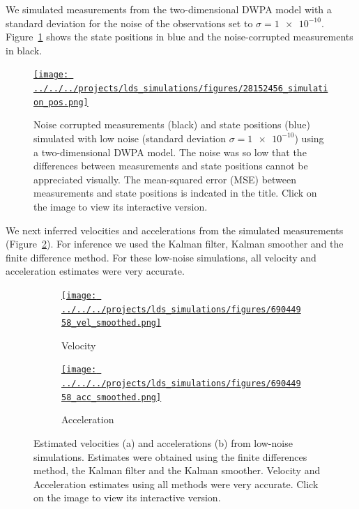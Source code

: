 \documentclass[12pt]{article}
\begin{document}
We simulated measurements from the two-dimensional DWPA model with a standard
deviation for the noise of the observations set to $\sigma=\num{1e-10}$.
Figure~\ref{fig:simulations_low_noise} shows the state positions in blue and
the noise-corrupted measurements in black.

\begin{figure}

    \centering
    \href{http://www.gatsby.ucl.ac.uk/~rapela/fwg/lds_repo/inference/figures/28152456_simulation_pos.html}{\texttt{[image: ../../../projects/lds\_simulations/figures/28152456\_simulation\_pos.png]}}

    \caption{Noise corrupted measurements (black) and state positions
    (blue) simulated with low noise (standard deviation $\sigma=\num{1e-10}$)
    using a two-dimensional DWPA model. The noise was so low that the
    differences between measurements and state positions cannot be appreciated
    visually.  The mean-squared error (MSE) between measurements and state
    positions is indcated in the title.
    Click on the image to view its interactive version.}

        \label{fig:simulations_low_noise}

\end{figure}

We next inferred velocities and accelerations from the simulated measurements
(Figure~\ref{fig:vel_acc_low_noise}). For inference we used the Kalman filter,
Kalman smoother and the finite difference method. For these low-noise
simulations, all velocity and acceleration estimates were very accurate.

\begin{figure}

    \begin{subfigure}{\textwidth}
        \centering
        \href{http://www.gatsby.ucl.ac.uk/~rapela/fwg/lds_repo/inference/figures/69044958_vel_smoothed.html}{\texttt{[image: ../../../projects/lds\_simulations/figures/69044958\_vel\_smoothed.png]}}
        \caption{Velocity}
    \end{subfigure}

    \begin{subfigure}{\textwidth}
        \centering
        \href{http://www.gatsby.ucl.ac.uk/~rapela/fwg/lds_repo/inference/figures/69044958_acc_smoothed.html}{\texttt{[image: ../../../projects/lds\_simulations/figures/69044958\_acc\_smoothed.png]}}
        \caption{Acceleration}
    \end{subfigure}

    \caption{Estimated velocities (a) and accelerations (b) from low-noise
    simulations.  Estimates were obtained using the finite differences method,
    the Kalman filter and the Kalman smoother. Velocity and Acceleration
    estimates using all methods were very accurate.
    Click on the image to view its interactive version.}

    \label{fig:vel_acc_low_noise}

\end{figure}
\end{document}
